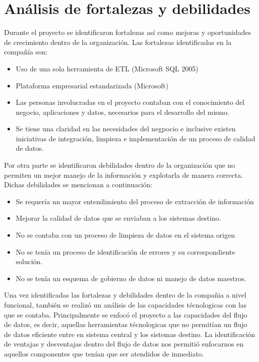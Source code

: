 \section{Análisis de fortalezas y debilidades}
Durante el proyecto se identificaron fortalezas así como mejoras y oportunidades de crecimiento dentro de la organización. Las fortalezas identificadas en la compañía son:

\begin{itemize}
\item Uso de una sola herramienta de ETL (Microsoft SQL 2005)
\item Plataforma empresarial estandarizada (Microsoft)
\item Las personas involucradas en el proyecto contaban con el conocimiento del negocio, aplicaciones y datos, necesarios para el desarrollo del mismo.
\item Se tiene una claridad en las necesidades del negpocio e inclusive existen iniciativas de integración, limpieza e implementación de un proceso de calidad de datos.
\end{itemize}

Por otra parte se identificaron debilidades dentro de la organización que no permiten un mejor manejo de la información y explotarla de manera correcta. Dichas debilidades se mencionan a continuación:

\begin{itemize}
\item Se requería un mayor entendimiento del proceso de extracción de información
\item Mejorar la calidad de datos que se enviaban a los sistemas destino.
\item No se contaba con un proceso de limpieza de datos en el sistema origen
\item No se tenía un proceso de identificación de errores y su correspondiente solución.
\item No se tenía un esquema de gobierno de datos ni manejo de datos maestros.
\end{itemize}

Una vez identificadas las fortalezas y debilidades dentro de la compañia a nivel funcional, también se realizó un análisis de las capacidades técnologicas con las que se contaba. Principalmente se enfocó el proyecto a las capacidades del flujo de datos, es decir, aquellas herramientas técnologicas que no permitían un flujo de datos eficiente entre en sistema central y los sistemas destino. La identificación de ventajas y desventajas dentro del flujo de datos nos permitió enfocarnos en aquellos componentes que tenían que ser atendidos de inmediato.

